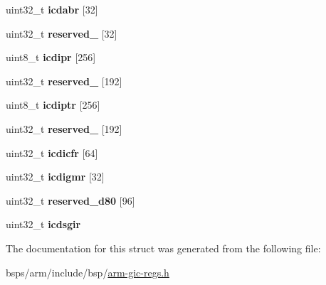 \begin{DoxyCompactItemize}
uint32\+\_\+t {\bfseries icdabr} \mbox{[}32\mbox{]}
\item 
\mbox{\label{structgic__dist_ab0a2b97012ac24ded7f125a760415c2d}} 
uint32\+\_\+t {\bfseries reserved\+\_} \mbox{[}32\mbox{]}
\item 
\mbox{\label{structgic__dist_a751cff53c975c267911473535430db67}} 
uint8\+\_\+t {\bfseries icdipr} \mbox{[}256\mbox{]}
\item 
\mbox{\label{structgic__dist_a1ad5324d27e739b8415c1d2010b824ee}} 
uint32\+\_\+t {\bfseries reserved\+\_} \mbox{[}192\mbox{]}
\item 
\mbox{\label{structgic__dist_a5f072118b30a56ef968f8b84ab1a94a3}} 
uint8\+\_\+t {\bfseries icdiptr} \mbox{[}256\mbox{]}
\item 
\mbox{\label{structgic__dist_adb78aac223fddf2e131301197163660f}} 
uint32\+\_\+t {\bfseries reserved\+\_} \mbox{[}192\mbox{]}
\item 
\mbox{\label{structgic__dist_a3bb98e38b35844f8e09e52d158e95804}} 
uint32\+\_\+t {\bfseries icdicfr} \mbox{[}64\mbox{]}
\item 
\mbox{\label{structgic__dist_a264d1c9d4575c614692af920c5454631}} 
uint32\+\_\+t {\bfseries icdigmr} \mbox{[}32\mbox{]}
\item 
\mbox{\label{structgic__dist_aff09438e4249829c26c772286a7850e8}} 
uint32\+\_\+t {\bfseries reserved\+\_\+d80} \mbox{[}96\mbox{]}
\item 
\mbox{\label{structgic__dist_ad602d9639b211508faa2fe403c839df1}} 
uint32\+\_\+t {\bfseries icdsgir}
\end{DoxyCompactItemize}


The documentation for this struct was generated from the following file\+:\begin{DoxyCompactItemize}
\item 
bsps/arm/include/bsp/\mbox{\hyperlink{arm-gic-regs_8h}{arm-\/gic-\/regs.\+h}}\end{DoxyCompactItemize}
